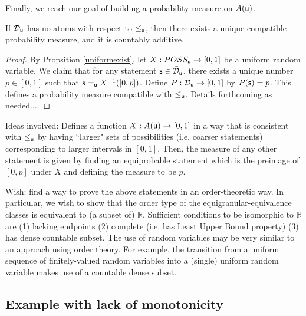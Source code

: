 \documentclass[10pt, onecolumn, longbibliography, nofootinbib]{revtex4-2}
\begin{document}
Finally, we reach our goal of building a probability measure on $A(\stmt[u])$. 

\begin{prop}
If $\tdomain_{\stmt[u]}$ has no atoms with respect to $\lequ$, then there exists a unique compatible probability measure, and it is countably additive. 
\end{prop}
\begin{proof}
By Propsition \ref{uniformexist}, let $X:POSS_{\stmt[u]}\to[0,1]$ be a uniform random variable.
We claim that for any statement $\stmt\in\tdomain_{\stmt[u]}$, there exists a unique number $p\in[0,1]$ such that $\stmt\equ X^{-1}([0,p])$. Define $P:\tdomain_{\stmt[u]}\to[0,1]$ by $P(\stmt)= p$. This defines a probability measure compatible with $\lequ$. Details forthcoming as needed....
\end{proof}

Ideas involved: Defines a function $X:A(\stmt[u])\to [0,1]$ in a way that is consistent with $\lequ$ by having ``larger" sets of possibilities (i.e. coarser statements) corresponding to larger intervals in $[0,1]$. Then, the measure of any other statement is given by finding an equiprobable statement which is the preimage of $[0,p]$ under $X$ and defining the measure to be $p$.  

Wish: find a way to prove the above statements in an order-theoretic way. In particular, we wish to show that the order type of the equigranular-equivalence classes is equivalent to (a subset of) $\mathbb{R}$. Sufficient conditions to be isomorphic to $\mathbb{R}$ are (1) lacking endpoints (2) complete (i.e. has Least Upper Bound property) (3) has dense countable subset. The use of random variables may be very similar to an approach using order theory. For example, the transition from a uniform sequence of finitely-valued random variables into a (single) uniform random variable makes use of a countable dense subset. 








\subsection{Example with lack of monotonicity}
\end{document}
